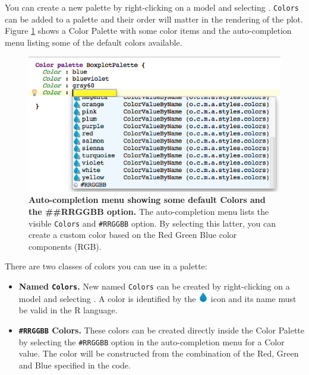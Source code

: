 You can create a new palette by right-clicking on a model and selecting . \texttt{Colors} can be added to a palette and their order will matter in the rendering of the plot. Figure \ref{fig:ColorItem} shows a Color Palette with some color items and the auto-completion menu listing some of the default colors available.

\begin{figure}[h!tbp]
  \centering
  \includegraphics[width=\figWidthWide]{figures/ColorItem.png}
\caption[Color Item.]{\textbf{Auto-completion menu showing some default Colors and the \#\#RRGGBB option.} The auto-completion menu lists the visible \texttt{Colors} and \texttt{\#RRGGBB} option. By selecting this latter, you can create a custom color based on the Red Green Blue color components (RGB).}
\label{fig:ColorItem}
\end{figure}

There are two classes of colors you can use in a palette:
\begin{itemize}
\item \textbf{Named \texttt{Colors}.} New named \texttt{Colors} can be created by right-clicking on a model and selecting . A color is identified by the \includegraphics[height=2ex]{figures/color.png} icon and its name must be valid in the R language.
\item \textbf{\texttt{\#RRGGBB} Colors.} These colors can be created directly inside the Color Palette by selecting the \texttt{\#RRGGBB} option in the auto-completion menu for a Color value. The color will be constructed from the combination of the Red, Green and Blue specified in the code.
\end{itemize} 

